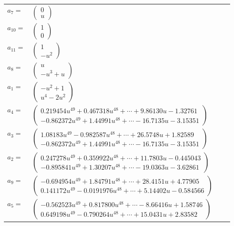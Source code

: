 \documentclass[1p]{elsarticle_modified}
\theoremstyle{definition}
\begin{document}
\begin{tabular}{m{7pt} m{180pt} m{7pt} m{180pt} }
\flushright $a_{7}=$&$\begin{pmatrix}0\\u\end{pmatrix}$ \\
\flushright $a_{10}=$&$\begin{pmatrix}1\\0\end{pmatrix}$ \\
\flushright $a_{11}=$&$\begin{pmatrix}1\\- u^2\end{pmatrix}$ \\
\flushright $a_{8}=$&$\begin{pmatrix}u\\- u^3+u\end{pmatrix}$ \\
\flushright $a_{1}=$&$\begin{pmatrix}- u^2+1\\u^4-2 u^2\end{pmatrix}$ \\
\flushright $a_{4}=$&$\begin{pmatrix}0.219454 u^{49}+0.467318 u^{48}+\cdots+9.86130 u-1.32761\\-0.862372 u^{49}+1.44991 u^{48}+\cdots-16.7135 u-3.15351\end{pmatrix}$ \\
\flushright $a_{3}=$&$\begin{pmatrix}1.08183 u^{49}-0.982587 u^{48}+\cdots+26.5748 u+1.82589\\-0.862372 u^{49}+1.44991 u^{48}+\cdots-16.7135 u-3.15351\end{pmatrix}$ \\
\flushright $a_{2}=$&$\begin{pmatrix}0.247278 u^{49}+0.359922 u^{48}+\cdots+11.7803 u-0.445043\\-0.895841 u^{49}+1.30207 u^{48}+\cdots-19.0363 u-3.62861\end{pmatrix}$ \\
\flushright $a_{9}=$&$\begin{pmatrix}-0.694954 u^{49}+1.84791 u^{48}+\cdots+28.4151 u+4.77905\\0.141172 u^{49}-0.0191976 u^{48}+\cdots+5.14402 u-0.584566\end{pmatrix}$ \\
\flushright $a_{5}=$&$\begin{pmatrix}-0.562523 u^{49}+0.817800 u^{48}+\cdots-8.66416 u+1.58746\\0.649198 u^{49}-0.790264 u^{48}+\cdots+15.0431 u+2.83582\end{pmatrix}$ \\

\end{tabular}
\end{document}
